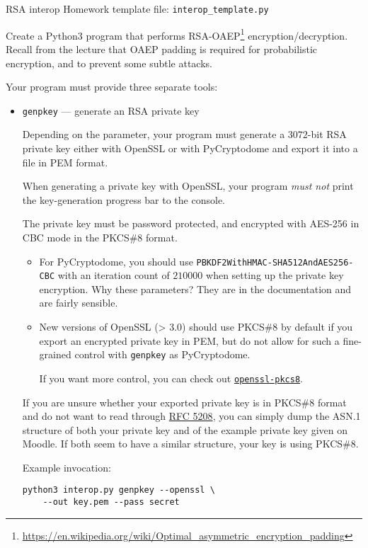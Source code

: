 \documentclass{homework}
\begin{document}
\begin{task}{RSA interop}
  Homework template file: \texttt{interop\_template.py}

  Create a Python3 program that performs RSA-OAEP\footnote{\url{https://en.wikipedia.org/wiki/Optimal_asymmetric_encryption_padding}} encryption/decryption.
  Recall from the lecture that OAEP padding is required for probabilistic encryption, and to prevent some subtle attacks.

  Your program must provide three separate tools:
  \begin{itemize}
    \item \texttt{genpkey} --- generate an RSA private key

    Depending on the parameter, your program must generate a $3072$-bit RSA private key either with OpenSSL or with PyCryptodome and export it into a file in PEM format.

    When generating a private key with OpenSSL, your program \emph{must not} print the key-generation progress bar to the console.

    The private key must be password protected, and encrypted with AES-256 in CBC mode in the PKCS\#8 format.
    \begin{itemize}
      \item For PyCryptodome, you should use \texttt{PBKDF2WithHMAC-SHA512AndAES256-CBC} with an iteration count of $210 000$ when setting up the private key encryption.
      Why these parameters?
      They are in the documentation and are fairly sensible.
      \item New versions of OpenSSL (> 3.0) should use PKCS\#8 by default if you export an encrypted private key in PEM, but do not allow for such a fine-grained control with \texttt{genpkey} as PyCryptodome.
      
      If you want more control, you can check out \href{https://www.openssl.org/docs/man3.2/man1/openssl-pkcs8.html}{\texttt{openssl-pkcs8}}.
    \end{itemize}

    If you are unsure whether your exported private key is in PKCS\#8 format and do not want to read through \href{https://datatracker.ietf.org/doc/html/rfc5208}{RFC 5208}, you can simply dump the ASN.1 structure of both your private key and of the example private key given on Moodle.
    If both seem to have a similar structure, your key is using PKCS\#8.

    Example invocation:
    \begin{Verbatim}
python3 interop.py genpkey --openssl \
    --out key.pem --pass secret
    \end{Verbatim}


\end{itemize}
\end{task}
\end{document}

